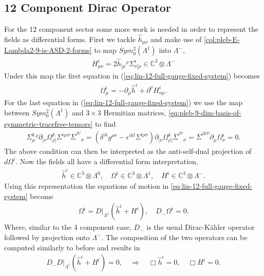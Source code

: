 \documentclass[10pt]{report}
\theoremstyle{definition}
\newcommand{\C}[0]{\mathbb{C}}
\newcommand{\E}[0]{\C^3}
\newcommand{\asd}[0]{\overline{\Sigma}}
\begin{document}
        \subsection{12 Component Dirac Operator}
        For the 12 component sector some more work is needed in order to represent the fields as differential forms. First we tackle $\hat{h}_{\mu\nu}$ and make use of \cref{col:pleb-E-Lambda2-9-is-ASD-2-forms} to map $Sym^2_0(\Lambda^1)$ into $\Lambda^-$,
        \begin{align}
            H^i_{\mu\nu} = 2\hat{h}_{[\mu}{}^\rho \Sigma^i_{\nu]\rho} \in \E \otimes \Lambda^-
        \end{align}
        Under this map the first equation in (\ref{eq:lin-12-full-gauge-fixed-system}) becomes
        \begin{align}
            \Omega^i_\mu = - \partial_\mu \hat{h}^i + \partial^\nu H^i_{\nu\mu}.
        \end{align}
        For the last equation in (\ref{eq:lin-12-full-gauge-fixed-system}) we use the map between $Sym^2_0(\Lambda^1)$ and $3\times 3$ Hermitian matrices, \cref{eq:pleb-9-dim-basis-of-symmetric-tracefree-tensors} to find 
        \begin{align}
            \Sigma^k_\mu{}^\rho \partial_{[\nu} \Omega^k_{\rho]} \Sigma^{i\mu\sigma} \asd^{j\nu}{}_\sigma = (\delta^{ik} g^{\rho\sigma} - \epsilon^{ikl} \Sigma^{l\rho\sigma}) \partial_{[\nu} \Omega^k_{\rho]} \asd^{j\nu}{}_\sigma = \asd^{j\mu\nu} \partial_\mu \Omega^i_\nu = 0.
        \end{align}
        The above condition can then be interpreted as the anti-self-dual projection of $d\Omega^i$.
        Now the fields all have a differential form interpretation,
        \begin{align}
            \hat{h}^i \in \E \otimes \Lambda^0, \quad \Omega^i \in \E \otimes \Lambda^1, \quad H^i \in \E \otimes \Lambda^-.
        \end{align}
        Using this representation the equations of motion in \cref{eq:lin-12-full-gauge-fixed-system} become
        \begin{align}
            \Omega^i = D|_{\Lambda^1} (\hat{h}^i + H^i), \quad D_- \Omega^i = 0.
        \end{align}
        Where, similar to the 4 component case, $D_-$ is the usual Dirac-K\"ahler operator followed by projection onto $\Lambda^-$. The composition of the two operators can be computed similarly to before and results in
        \begin{align}
            D_- D|_{\Lambda^1} (\hat{h}^i + H^i) = 0, \quad \Rightarrow \quad \Box \hat{h}^i = 0, \quad \Box H^i = 0.
        \end{align}
\end{document}
